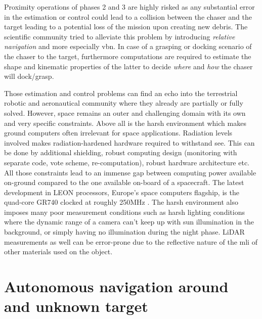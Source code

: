 Proximity operations of phases 2 and 3 are highly risked as any substantial error in the estimation or control could lead to a collision between the chaser and the target leading to a potential loss of the mission upon creating new debris. The scientific community tried to alleviate this problem by introducing \emph{relative navigation} and more especially \gls{vbn}. In case of a grasping or docking scenario of the chaser to the target, furthermore computations are required to estimate the shape and kinematic properties of the latter to decide \emph{where} and \emph{how} the chaser will dock/grasp.

Those estimation and control problems can find an echo into the terrestrial robotic and aeronautical community where they already are partially or fully solved. However, space remains an outer and challenging domain with its own and very specific constraints. Above all is the harsh environment which makes ground computers often irrelevant for space applications. Radiation levels involved makes radiation-hardened hardware required to withstand \gls{see}. This can be done by additional shielding, robust computing design (monitoring with separate code, vote scheme, re-computation), robust hardware architecture etc. All those constraints lead to an immense gap between computing power available on-ground compared to the one available on-board of a spacecraft. The latest development in LEON processors, Europe's space computers flagship, is the quad-core GR740 clocked at roughly 250MHz \citep{staff_space-grade_2019}. The harsh environment also imposes many poor measurement conditions such as harsh lighting conditions where the dynamic range of a camera can't keep up with sun illumination in the background, or simply having no illumination during the night phase. LiDAR measurements as well can be error-prone due to the reflective nature of the \gls{mli} of other materials used on the object.

\section{Autonomous navigation around and unknown target}
\label{intro:autonomous_navigation}

